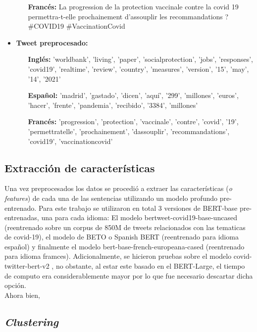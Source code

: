 \begin{itemize}
\begin{itemize}
        \item [\textbf{Francés:}] La progression de la protection vaccinale contre la covid 19 permettra-t-elle prochainement d'assouplir les recommandations ? \#COVID19 \#VaccinationCovid 
    \end{itemize}
    \item \textbf{Tweet preprocesado:}\\ 
    \begin{itemize}
        \item [\textbf{Inglés:}] 'worldbank', 'living', 'paper', 'socialprotection', 'jobs', 'responses', 'covid19', 'realtime', 'review', 'country', 'measures', 'version', '15', 'may', '14', '2021'
        \item [\textbf{Español:}] 'madrid', 'gastado', 'dicen', 'aquí', '299', 'millones', 'euros', 'hacer', 'frente', 'pandemia', 'recibido', '3384', 'millones'
        \item [\textbf{Francés:}] 'progression', 'protection', 'vaccinale', 'contre', 'covid', '19', 'permettratelle', 'prochainement', 'dassouplir', 'recommandations', 'covid19', 'vaccinationcovid'
    \end{itemize}
\end{itemize}

\subsection{Extracción de características}

Una vez preprocesados los datos se procedió a extraer las características (\textit{o features}) de cada una de las sentencias utilizando un modelo profundo pre-entrenado. Para este trabajo se utilizaron en total 3 versiones de BERT-base pre-entrenadas, una para cada idioma: El modelo 
bertweet-covid19-base-uncased \cite{bertweet} (reentrenado sobre un corpus de 850M de tweets relacionados con las tematicas de covid-19), el modelo de BETO o Spanish BERT \cite{CaneteCFP2020} (reentrenado para idioma español) y finalmente el modelo bert-base-french-europeana-cased (reentrenado para idioma framces). Adicionalmente, se hicieron pruebas sobre el modelo covid-twitter-bert-v2 \cite{muller2020covid}, no obstante, al estar este basado en el BERT-Large, el tiempo de computo era considerablemente mayor por lo que fue necesario descartar dicha opción. \\

Ahora bien, 


\subsection{\textit{Clustering}}


